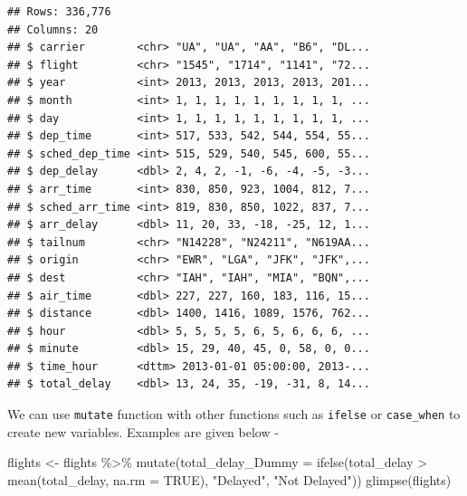 \documentclass[
]{book}
\newenvironment{Shaded}{\begin{snugshade}}{\end{snugshade}}
\newcommand{\AttributeTok}[1]{\textcolor[rgb]{0.77,0.63,0.00}{#1}}
\newcommand{\ConstantTok}[1]{\textcolor[rgb]{0.00,0.00,0.00}{#1}}
\newcommand{\FunctionTok}[1]{\textcolor[rgb]{0.00,0.00,0.00}{#1}}
\newcommand{\NormalTok}[1]{#1}
\newcommand{\OtherTok}[1]{\textcolor[rgb]{0.56,0.35,0.01}{#1}}
\newcommand{\SpecialCharTok}[1]{\textcolor[rgb]{0.00,0.00,0.00}{#1}}
\newcommand{\StringTok}[1]{\textcolor[rgb]{0.31,0.60,0.02}{#1}}
\begin{document}
\begin{verbatim}
## Rows: 336,776
## Columns: 20
## $ carrier        <chr> "UA", "UA", "AA", "B6", "DL...
## $ flight         <chr> "1545", "1714", "1141", "72...
## $ year           <int> 2013, 2013, 2013, 2013, 201...
## $ month          <int> 1, 1, 1, 1, 1, 1, 1, 1, 1, ...
## $ day            <int> 1, 1, 1, 1, 1, 1, 1, 1, 1, ...
## $ dep_time       <int> 517, 533, 542, 544, 554, 55...
## $ sched_dep_time <int> 515, 529, 540, 545, 600, 55...
## $ dep_delay      <dbl> 2, 4, 2, -1, -6, -4, -5, -3...
## $ arr_time       <int> 830, 850, 923, 1004, 812, 7...
## $ sched_arr_time <int> 819, 830, 850, 1022, 837, 7...
## $ arr_delay      <dbl> 11, 20, 33, -18, -25, 12, 1...
## $ tailnum        <chr> "N14228", "N24211", "N619AA...
## $ origin         <chr> "EWR", "LGA", "JFK", "JFK",...
## $ dest           <chr> "IAH", "IAH", "MIA", "BQN",...
## $ air_time       <dbl> 227, 227, 160, 183, 116, 15...
## $ distance       <dbl> 1400, 1416, 1089, 1576, 762...
## $ hour           <dbl> 5, 5, 5, 5, 6, 5, 6, 6, 6, ...
## $ minute         <dbl> 15, 29, 40, 45, 0, 58, 0, 0...
## $ time_hour      <dttm> 2013-01-01 05:00:00, 2013-...
## $ total_delay    <dbl> 13, 24, 35, -19, -31, 8, 14...
\end{verbatim}

We can use \texttt{mutate} function with other functions such as \texttt{ifelse} or \texttt{case\_when} to create new variables. Examples are given below -

\begin{Shaded}
\begin{Highlighting}[]
\NormalTok{flights }\OtherTok{\textless{}{-}}\NormalTok{ flights }\SpecialCharTok{\%\textgreater{}\%} 
  \FunctionTok{mutate}\NormalTok{(}\AttributeTok{total\_delay\_Dummy =} \FunctionTok{ifelse}\NormalTok{(total\_delay }\SpecialCharTok{\textgreater{}} \FunctionTok{mean}\NormalTok{(total\_delay, }\AttributeTok{na.rm =} \ConstantTok{TRUE}\NormalTok{), }\StringTok{"Delayed"}\NormalTok{, }\StringTok{"Not Delayed"}\NormalTok{)) }
\FunctionTok{glimpse}\NormalTok{(flights)  }
\end{Highlighting}
\end{Shaded}
\end{document}
